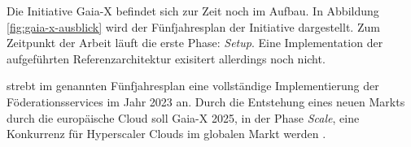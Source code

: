 Die Initiative Gaia-X befindet sich zur Zeit noch im Aufbau.
In Abbildung \ref{fig:gaia-x-ausblick} wird der Fünfjahresplan der Initiative dargestellt.
Zum Zeitpunkt der Arbeit läuft die erste Phase: \emph{Setup}.
Eine Implementation der aufgeführten Referenzarchitektur exisitert allerdings noch nicht.

\citeauthor{Bonfiglio2021} strebt im genannten Fünfjahresplan eine vollständige Implementierung der Föderationsservices
im Jahr 2023 an.
Durch die Entstehung eines neuen Markts durch die europäische Cloud soll Gaia-X 2025, in der Phase \emph{Scale},
eine Konkurrenz für Hyperscaler Clouds im globalen Markt werden \cite{Bonfiglio2021}.

